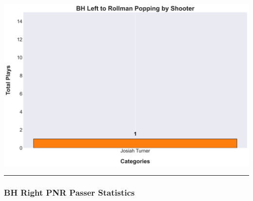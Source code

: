 \documentclass[a4paper,12pt]{article}
\begin{document}
\begin{table}[H]
{\begin{minipage}[t]{0.6\textwidth}
{\begin{tabular}
                
            
                
            


            \bottomrule
        \end{tabular}
        } %
    \end{minipage}
    } %
    \hfill %
    \begin{minipage}[c]{0.35\textwidth} %
        \flushright
        \includegraphics[width=\textwidth, height=.14\textheight]{images/PNR_PassLeftPopsPlayer_Freq.png} %
    \end{minipage}
\end{table}

\vspace{-1em} %
\hrule height 1pt width 1\textwidth %
\vspace{1em} %

\subsubsection{BH Right PNR Passer Statistics}
\end{document}
